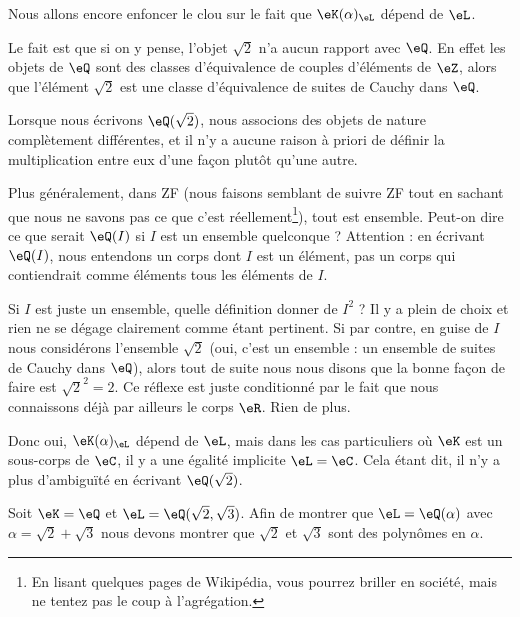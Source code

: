 \begin{normaltext}
	Nous allons encore enfoncer le clou sur le fait que \( \eK(\alpha)_{\eL}\) dépend de \( \eL\).

	Le fait est que si on y pense, l'objet \( \sqrt{ 2 }\) n'a aucun rapport avec \( \eQ\). En effet les objets de \( \eQ\) sont des classes d'équivalence de couples d'éléments de \( \eZ\), alors que l'élément \( \sqrt{ 2 }\) est une classe d'équivalence de suites de Cauchy dans \( \eQ\).

	Lorsque nous écrivons \( \eQ(\sqrt{ 2 })\), nous associons des objets de nature complètement différentes, et il n'y a aucune raison à priori de définir la multiplication entre eux d'une façon plutôt qu'une autre.

	Plus généralement, dans ZF (nous faisons semblant de suivre ZF tout en sachant que nous ne savons pas ce que c'est réellement\footnote{En lisant quelques pages de Wikipédia, vous pourrez briller en société, mais ne tentez pas le coup à l'agrégation.}), tout est ensemble. Peut-on dire ce que serait \( \eQ(I)\) si \( I\) est un ensemble quelconque ? Attention : en écrivant \( \eQ(I)\), nous entendons un corps dont \( I\) est un élément, pas un corps qui contiendrait comme éléments tous les éléments de \( I\).

	Si \( I\) est juste un ensemble, quelle définition donner de \( I^2\) ? Il y a plein de choix et rien ne se dégage clairement comme étant pertinent. Si par contre, en guise de \( I\) nous considérons l'ensemble \( \sqrt{ 2 }\) (oui, c'est un ensemble : un ensemble de suites de Cauchy dans \( \eQ\)), alors tout de suite nous nous disons que la bonne façon de faire est \( \sqrt{ 2 }^2=2\). Ce réflexe est juste conditionné par le fait que nous connaissons déjà par ailleurs le corps \( \eR\). Rien de plus.

	Donc oui, \( \eK(\alpha)_{\eL}\) dépend de \( \eL\), mais dans les cas particuliers où \( \eK\) est un sous-corps de \( \eC\), il y a une égalité implicite \( \eL=\eC\). Cela étant dit, il n'y a plus d'ambiguïté en écrivant \( \eQ(\sqrt{ 2 })\).
\end{normaltext}


\begin{example}		\label{EXooKLRBooUswzpV}
	Soit \( \eK=\eQ\) et \( \eL=\eQ(\sqrt{2},\sqrt{3})\). Afin de montrer que \( \eL=\eQ(\alpha)\) avec \( \alpha=\sqrt{2}+\sqrt{3}\) nous devons montrer que \( \sqrt{2}\) et \( \sqrt{3}\) sont des polynômes en \( \alpha\).
\end{example}

